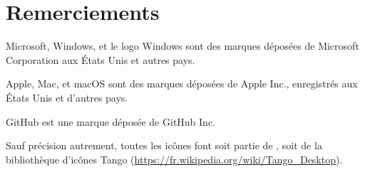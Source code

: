 
\chapter*{Remerciements}

Microsoft, Windows, et le logo Windows sont des marques déposées de Microsoft Corporation aux États Unis et autres pays.

Apple, Mac, et macOS sont des marques déposées de Apple Inc., enregistrés aux États Unis et d'autres pays.

GitHub est une marque déposée de GitHub Inc.

Sauf précision autrement, toutes les icônes font soit partie de \Tw, soit de la bibliothèque d'icônes Tango (\url{https://fr.wikipedia.org/wiki/Tango_Desktop}).

